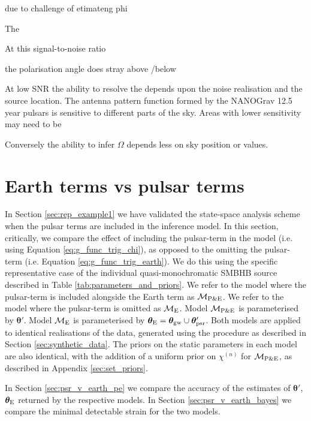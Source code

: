 \documentclass[fleqn,usenatbib,useAMS]{mnras}
\begin{document}
due to challenge of etimateng phi


The 

At this signal-to-noise ratio 


the polarisation angle does stray above /below 


At low SNR the ability to resolve the depends upon the noise realisation and the source location. The antenna pattern function formed by the NANOGrav 12.5 year pulsars is sensitive to different parts of the sky. Areas with lower sensitivity may need to be  



Conversely the ability to infer $\Omega$ depends less on sky position or values. 



\section{Earth terms vs pulsar terms}\label{sec:earth_vs_psr}
In Section \ref{sec:rep_example1} we have validated the state-space analysis scheme when the pulsar terms are included in the inference model. In this section, critically, we compare the effect of including the pulsar-term in the model (i.e. using Equation \eqref{eq:g_func_trig_chi}), as opposed to the omitting the pulsar-term (i.e. Equation \eqref{eq:g_func_trig_earth}). We do this using the specific representative case of the individual quasi-monochromatic SMBHB source described in Table \ref{tab:parameters_and_priors}. We refer to the model where the pulsar-term is included alongside the Earth term as $\mathcal{M}_{\rm P \& E}$. We refer to the model where the pulsar-term is omitted as 
$\mathcal{M}_{\rm E}$. Model $\mathcal{M}_{\rm P \& E}$ is parameterised by $\boldsymbol{\theta}'$. Model $\mathcal{M}_{\rm E}$ is parameterised by $\boldsymbol{\theta}_{\rm E} = \boldsymbol{\theta}_{\rm gw} \cup \boldsymbol{\theta}'_{\rm psr}$. Both models are applied to identical realisations of the data, generated using the procedure as described in Section  \ref{sec:synthetic_data}. The priors on the static parameters in each model are also identical, with the addition of a uniform prior on $\chi^{(n)}$ for $\mathcal{M}_{\rm P \& E}$, as described in Appendix \ref{sec:set_priors}. \newline 


In Section \ref{sec:psr_v_earth_pe} we compare the accuracy of the estimates of $\boldsymbol{\theta'}$, $\boldsymbol{\theta}_{\rm E}$ returned by the respective models. In Section \ref{sec:psr_v_earth_bayes} we compare the minimal detectable strain for the two models. 
\end{document}
